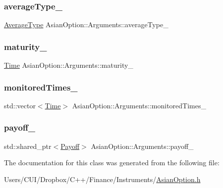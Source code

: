 \subsubsection{\texorpdfstring{average\+Type\+\_\+}{averageType\_}}
{\footnotesize\ttfamily \hyperlink{class_asian_option_add7292791bf85820ff9fdbfd4407f3b9}{Average\+Type} Asian\+Option\+::\+Arguments\+::average\+Type\+\_\+}

\hypertarget{class_asian_option_1_1_arguments_ad39a2dee07ec9ec77cb64cb75e44a056}{}\label{class_asian_option_1_1_arguments_ad39a2dee07ec9ec77cb64cb75e44a056} 
\subsubsection{\texorpdfstring{maturity\+\_\+}{maturity\_}}
{\footnotesize\ttfamily \hyperlink{_name_def_8h_ac2d3e0ba793497bcca555c7c2cf64ff3}{Time} Asian\+Option\+::\+Arguments\+::maturity\+\_\+}

\hypertarget{class_asian_option_1_1_arguments_a27e013476613aec57076742ba561a722}{}\label{class_asian_option_1_1_arguments_a27e013476613aec57076742ba561a722} 
\subsubsection{\texorpdfstring{monitored\+Times\+\_\+}{monitoredTimes\_}}
{\footnotesize\ttfamily std\+::vector$<$\hyperlink{_name_def_8h_ac2d3e0ba793497bcca555c7c2cf64ff3}{Time}$>$ Asian\+Option\+::\+Arguments\+::monitored\+Times\+\_\+}

\hypertarget{class_asian_option_1_1_arguments_ae44f022e21c05aa688d1d94a0f57d125}{}\label{class_asian_option_1_1_arguments_ae44f022e21c05aa688d1d94a0f57d125} 
\subsubsection{\texorpdfstring{payoff\+\_\+}{payoff\_}}
{\footnotesize\ttfamily std\+::shared\+\_\+ptr$<$\hyperlink{class_payoff}{Payoff}$>$ Asian\+Option\+::\+Arguments\+::payoff\+\_\+}



The documentation for this class was generated from the following file\+:\begin{DoxyCompactItemize}
\item 
Users/\+C\+U\+I/\+Dropbox/\+C++/\+Finance/\+Instruments/\hyperlink{_asian_option_8h}{Asian\+Option.\+h}\end{DoxyCompactItemize}
